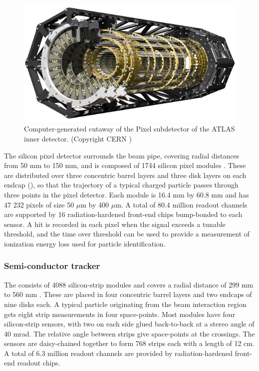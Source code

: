 \begin{figure}[t]
\includegraphics{pixel.jpg}
\caption{Computer-generated cutaway of the Pixel subdetector of the ATLAS inner detector. (Copyright CERN \cite{Pequenao:1095925})}
\label{fig:atlas_pixel}
\end{figure}

The silicon pixel detector surrounds the beam pipe, covering radial distances from 50 mm to 150 mm, and is composed of 1744 silicon pixel modules \cite{Aad:2008zz}.
These are distributed over three concentric barrel layers and three disk layers on each endcap (), so that the trajectory of a typical charged particle passes through three points in the pixel detector.
Each module is 16.4 mm by 60.8 mm and has 47 232 pixels of size 50 $\mu$m by 400 $\mu$m.
A total of 80.4 million readout channels are supported by 16 radiation-hardened front-end chips bump-bonded to each sensor.
A hit is recorded in each pixel when the signal exceeds a tunable threshold, and the time over threshold can be used to provide a measurement of ionization energy loss \dEdx used for particle identification.

\subsubsection{Semi-conductor tracker}

The \sct consists of 4088 silicon-strip modules and covers a radial distance of 299 mm to 560 mm \cite{Aad:2014mta}.
These are placed in four concentric barrel layers and two endcaps of nine disks each.
A typical particle originating from the beam interaction region gets eight strip measurements in four space-points.
Most modules have four silicon-strip sensors, with two on each side glued back-to-back at a stereo angle of 40 mrad.
The relative angle between strips give space-points at the crossings.
The sensors are daisy-chained together to form 768 strips each with a length of 12 cm.
A total of 6.3 million readout channels are provided by radiation-hardened front-end readout chips.

